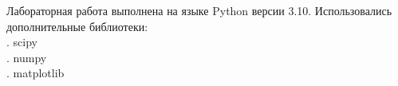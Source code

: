 \documentclass[../main.tex]{subfiles}
\begin{document}
    \noindent Лабораторная работа выполнена на языке Python версии 3.10. 
    \newline Использовались дополнительные библиотеки:\\
        . scipy\\
        . numpy\\
        . matplotlib\\
\end{document}
